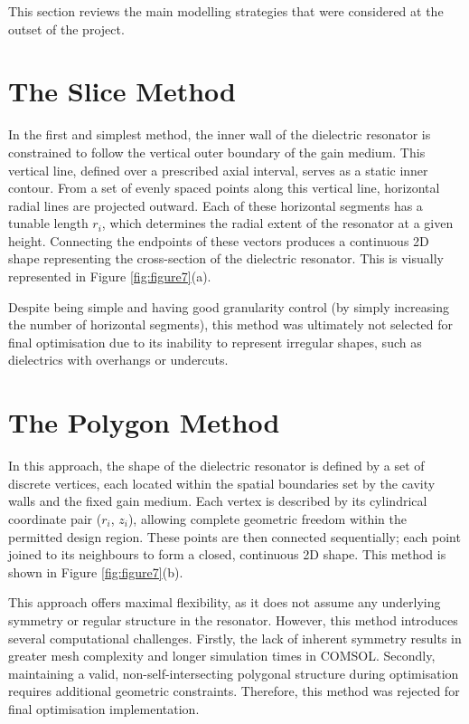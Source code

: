 This section reviews the main modelling strategies that were considered at the
outset of the project.

\section{The Slice Method}
\label{sec:section7}
In the first and simplest method, the inner wall of the dielectric resonator is
constrained to follow the vertical outer boundary of the gain medium. This
vertical line, defined over a prescribed axial interval, serves as a static
inner contour. From a set of evenly spaced points along this vertical line,
horizontal radial lines are projected outward. Each of these horizontal segments
has a tunable length $r_i$, which determines the radial extent of the resonator
at a given height. Connecting the endpoints of these vectors produces a
continuous 2D shape representing the cross-section of the dielectric resonator.
This is visually represented in Figure \ref{fig:figure7}(a).

Despite being simple and having good granularity control (by simply increasing
the number of horizontal segments), this method was ultimately not selected for
final optimisation due to its inability to represent irregular shapes, such as
dielectrics with overhangs or undercuts.

\section{The Polygon Method}
\label{sec:section8}
In this approach, the shape of the dielectric resonator is defined by a set of
discrete vertices, each located within the spatial boundaries set by the cavity
walls and the fixed gain medium. Each vertex is described by its cylindrical
coordinate pair ($r_i$, $z_i$), allowing complete geometric freedom within the
permitted design region. These points are then connected sequentially; each
point joined to its neighbours to form a closed, continuous 2D shape. This
method is shown in Figure \ref{fig:figure7}(b).

This approach offers maximal flexibility, as it does not assume any underlying
symmetry or regular structure in the resonator. However, this method introduces
several computational challenges. Firstly, the lack of inherent symmetry results
in greater mesh complexity and longer simulation times in COMSOL. Secondly,
maintaining a valid, non-self-intersecting polygonal structure during
optimisation requires additional geometric constraints. Therefore, this method
was rejected for final optimisation implementation.


